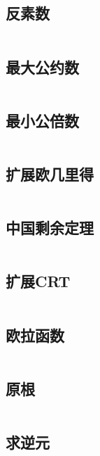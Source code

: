 \inputminted{cpp}{code/pollard_rho质因数分解.cc}

\subsection{	反素数} 

\inputminted{cpp}{code/反素数.cc}

\subsection{最大公约数} 

\inputminted{cpp}{code/gcd.cc}

\subsection{最小公倍数} 

\inputminted{cpp}{code/lcm.cc}

\subsection{扩展欧几里得} 

\inputminted{cpp}{code/exGcd.cc}

\subsection{中国剩余定理} 

\inputminted{cpp}{code/crt.cc}

\subsection{扩展CRT} 

\inputminted{cpp}{code/exCRT.cc}

\subsection{欧拉函数} 

\inputminted{cpp}{code/EulerPhi.cc}

\subsection{原根} 

\inputminted{cpp}{code/原根.cc}

\subsection{求逆元} 

